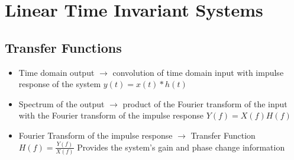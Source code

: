\documentclass[oneside]{book}
\begin{document}
    \chapter{Linear Time Invariant Systems}
        \section{Transfer Functions}
            \begin{itemize}
                \item Time domain output $\longrightarrow$ convolution of time domain input with impulse response of the system
                    \subitem $y(t) = x(t) * h(t)$
                \item Spectrum of the output $\longrightarrow$ product of the Fourier transform of the input with the Fourier transform of the impulse response
                    \subitem $Y(f) = X(f)H(f)$
                \item Fourier Transform of the impulse response $\longrightarrow$ Transfer Function
                    \subitem $H(f) = \frac{Y(f)}{X(f)}$
                    \subitem Provides the system's gain and phase change information
            \end{itemize}
\end{document}
